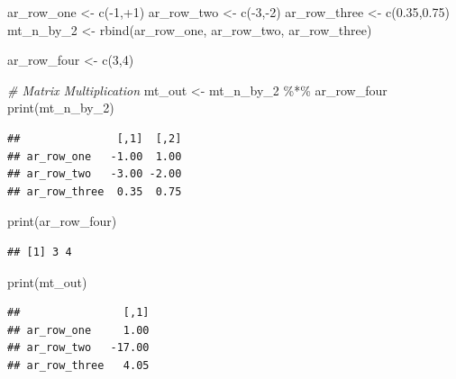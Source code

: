 \documentclass[
]{book}
\newenvironment{Shaded}{\begin{snugshade}}{\end{snugshade}}
\newcommand{\CommentTok}[1]{\textcolor[rgb]{0.56,0.35,0.01}{\textit{#1}}}
\newcommand{\DecValTok}[1]{\textcolor[rgb]{0.00,0.00,0.81}{#1}}
\newcommand{\FloatTok}[1]{\textcolor[rgb]{0.00,0.00,0.81}{#1}}
\newcommand{\FunctionTok}[1]{\textcolor[rgb]{0.00,0.00,0.00}{#1}}
\newcommand{\NormalTok}[1]{#1}
\newcommand{\OtherTok}[1]{\textcolor[rgb]{0.56,0.35,0.01}{#1}}
\newcommand{\SpecialCharTok}[1]{\textcolor[rgb]{0.00,0.00,0.00}{#1}}
\begin{document}
\begin{Shaded}
\begin{Highlighting}[]
\NormalTok{ar\_row\_one }\OtherTok{\textless{}{-}} \FunctionTok{c}\NormalTok{(}\SpecialCharTok{{-}}\DecValTok{1}\NormalTok{,}\SpecialCharTok{+}\DecValTok{1}\NormalTok{)}
\NormalTok{ar\_row\_two }\OtherTok{\textless{}{-}} \FunctionTok{c}\NormalTok{(}\SpecialCharTok{{-}}\DecValTok{3}\NormalTok{,}\SpecialCharTok{{-}}\DecValTok{2}\NormalTok{)}
\NormalTok{ar\_row\_three }\OtherTok{\textless{}{-}} \FunctionTok{c}\NormalTok{(}\FloatTok{0.35}\NormalTok{,}\FloatTok{0.75}\NormalTok{)}
\NormalTok{mt\_n\_by\_2 }\OtherTok{\textless{}{-}} \FunctionTok{rbind}\NormalTok{(ar\_row\_one, ar\_row\_two, ar\_row\_three)}

\NormalTok{ar\_row\_four }\OtherTok{\textless{}{-}} \FunctionTok{c}\NormalTok{(}\DecValTok{3}\NormalTok{,}\DecValTok{4}\NormalTok{)}

\CommentTok{\# Matrix Multiplication}
\NormalTok{mt\_out }\OtherTok{\textless{}{-}}\NormalTok{ mt\_n\_by\_2 }\SpecialCharTok{\%*\%}\NormalTok{ ar\_row\_four}
\FunctionTok{print}\NormalTok{(mt\_n\_by\_2)}
\end{Highlighting}
\end{Shaded}

\begin{verbatim}
##               [,1]  [,2]
## ar_row_one   -1.00  1.00
## ar_row_two   -3.00 -2.00
## ar_row_three  0.35  0.75
\end{verbatim}

\begin{Shaded}
\begin{Highlighting}[]
\FunctionTok{print}\NormalTok{(ar\_row\_four)}
\end{Highlighting}
\end{Shaded}

\begin{verbatim}
## [1] 3 4
\end{verbatim}

\begin{Shaded}
\begin{Highlighting}[]
\FunctionTok{print}\NormalTok{(mt\_out)}
\end{Highlighting}
\end{Shaded}

\begin{verbatim}
##                [,1]
## ar_row_one     1.00
## ar_row_two   -17.00
## ar_row_three   4.05
\end{verbatim}
\end{document}
